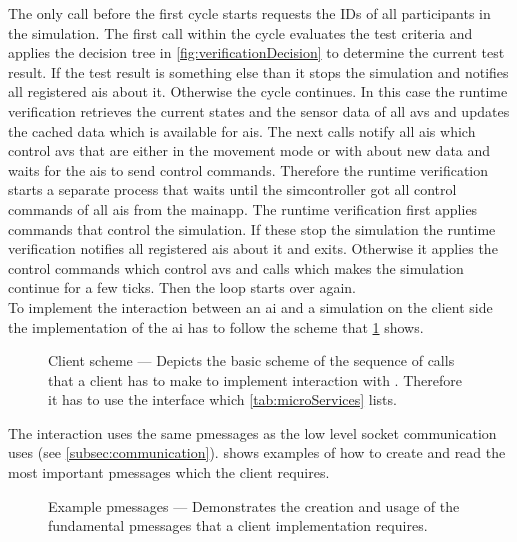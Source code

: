 The only call before the first cycle starts requests the IDs of all participants in the simulation.
The first call within the cycle evaluates the test criteria and applies the decision tree in \cref{fig:verificationDecision} to determine the current test result.
If the test result is something else than \trunknown{} it stops the simulation and notifies all registered \glspl{ai} about it.
Otherwise the cycle continues.
In this case the runtime verification retrieves the current states and the sensor data of all \glspl{av} and updates the cached data which is available for \glspl{ai}.
The next calls notify all \glspl{ai} which control \glspl{av} that are either in the movement mode \mmautonomous{} or \mmtraining{} with  about new data and waits for the \glspl{ai} to send control commands.
Therefore the runtime verification starts a separate process that waits until the \gls{simcontroller} got all control commands of all \glspl{ai} from the \gls{mainapp}.
The runtime verification first applies commands that control the simulation.
If these stop the simulation the runtime verification notifies all registered \glspl{ai} about it and exits.
Otherwise it applies the control commands which control \glspl{av} and calls  which makes the simulation continue for a few ticks.
Then the loop starts over again.\\
To implement the interaction between an \gls{ai} and a simulation on the client side the implementation of the \gls{ai} has to follow the scheme that \cref{fig:clientScheme} shows.
\begin{figure}
    \centering
    
    \medskip
    \caption{%
        Client scheme --- Depicts the basic scheme of the sequence of calls that a client has to make to implement interaction with \drivebuild{}.
        Therefore it has to use the interface which \cref{tab:microServices} lists.
    }\label{fig:clientScheme}
\end{figure}
The interaction uses the same \glspl{pmessage} as the low level socket communication uses (see \cref{subsec:communication}).
 shows examples of how to create and read the most important \glspl{pmessage} which the client requires.
\begin{figure}[h]
    \captionsetup{type=listing}
    \renewcommand{\thesublisting}{\alph{sublisting}}
    
    \medskip
    \caption{%
        Example \glspl{pmessage} --- Demonstrates the creation and usage of the fundamental \glspl{pmessage} that a client implementation requires.
    }\label{fig:exampleMessageUsage}
\end{figure}

